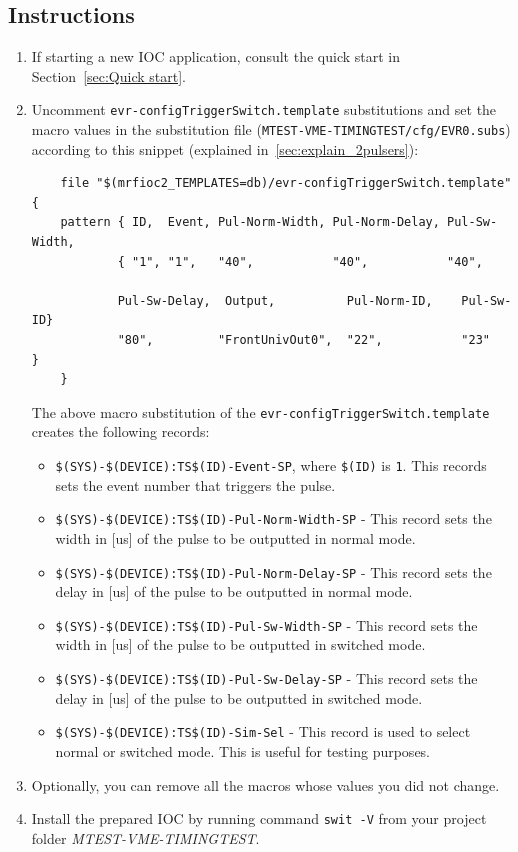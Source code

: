 \documentclass[12pt,a4paper]{article}
\begin{document}
\subsection{Instructions}
\begin{enumerate}
	\item If starting a new IOC application, consult the quick start in Section~\ref{sec:Quick start}.

	\item Uncomment \texttt{evr-configTriggerSwitch.template} substitutions and set the macro values in the substitution file \newline(\texttt{MTEST-VME-TIMINGTEST/cfg/EVR0.subs}) according to this snippet (explained in~\ref{sec:explain_2pulsers}):
\begin{verbatim}
	file "$(mrfioc2_TEMPLATES=db)/evr-configTriggerSwitch.template"{
	pattern { ID,  Event, Pul-Norm-Width, Pul-Norm-Delay, Pul-Sw-Width,
	        { "1", "1",   "40",           "40",           "40",            
      
	        Pul-Sw-Delay,  Output,          Pul-Norm-ID,    Pul-Sw-ID}
	        "80",         "FrontUnivOut0",  "22",           "23"     }
	}
\end{verbatim}
	The above macro substitution of the \texttt{evr-configTriggerSwitch.template} creates the following records:
	\begin{itemize}
		\item \texttt{\$(SYS)-\$(DEVICE):TS\$(ID)-Event-SP}, where \texttt{\$(ID)} is \texttt{1}. This records sets the event number that triggers the pulse.
		
		\item \texttt{\$(SYS)-\$(DEVICE):TS\$(ID)-Pul-Norm-Width-SP} - This record sets the width in [us] of the pulse to be outputted in normal mode. 
		
		\item \texttt{\$(SYS)-\$(DEVICE):TS\$(ID)-Pul-Norm-Delay-SP} - This record sets the delay in [us] of the pulse to be outputted in normal mode. 
		
		\item \texttt{\$(SYS)-\$(DEVICE):TS\$(ID)-Pul-Sw-Width-SP} - This record sets the width in [us] of the pulse to be outputted in switched mode.
		
		\item \texttt{\$(SYS)-\$(DEVICE):TS\$(ID)-Pul-Sw-Delay-SP} - This record sets the delay in [us] of the pulse to be outputted in switched mode.
		
		\item \texttt{\$(SYS)-\$(DEVICE):TS\$(ID)-Sim-Sel} - This record is used to select normal or switched mode. This is useful for testing purposes.
	\end{itemize}
	
	\item Optionally, you can remove all the macros whose values you did not change. 
	\item Install the prepared IOC by running command \texttt{swit -V} from your project folder \textit{MTEST-VME-TIMINGTEST}.
\end{enumerate}
\end{document}
